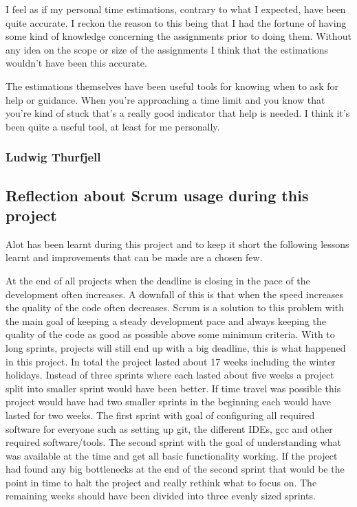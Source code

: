 I feel as if my personal time estimations, contrary to what I expected, have been quite accurate. I reckon the reason to this being that I had the fortune of having some kind of knowledge concerning the assignments prior to doing them. Without any idea on the scope or size of the assignments I think that the estimations wouldn't have been this accurate.

The estimations themselves have been useful tools for knowing when to ask for help or guidance. When you're approaching a time limit and you know that you're kind of stuck that's a really good indicator that help is needed. I think it's been quite a useful tool, at least for me personally.

\subsubsection{Ludwig Thurfjell}
\subsection{Reflection about Scrum usage during this project}
Alot has been learnt during this project and to keep it short the following lessons learnt and improvements that can be made are a chosen few.

At the end of all projects when the deadline is closing in the pace of the development often increases.
A downfall of this is that when the speed increases the quality of the code often decreases.
Scrum is a solution to this problem with the main goal of keeping a steady development pace and always keeping the quality of the code as good as possible above some minimum criteria.
With to long sprints, projects will still end up with a big deadline, this is what happened in this project.
In total the project lasted about 17 weeks including the winter holidays.
Instead of three sprints where each lasted about five weeks a project split into smaller sprint would have been better.
If time travel was possible this project would have had two smaller sprints in the beginning each would have lasted for two weeks.
The first sprint with goal of configuring all required software for everyone such as setting up git, the different IDEs, gcc and other required software/tools.
The second sprint with the goal of understanding what was available at the time and get all basic functionality working.
If the project had found any big bottlenecks at the end of the second sprint that would be the point in time to halt the project and really rethink what to focus on.
The remaining weeks should have been divided into three evenly sized sprints.


